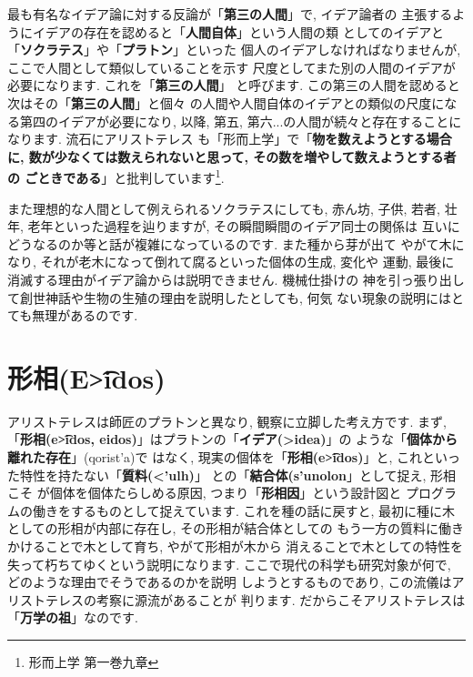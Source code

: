 最も有名なイデア論に対する反論が「\textbf{第三の人間}」で, イデア論者の
主張するようにイデアの存在を認めると「\textbf{人間自体}」という人間の類
としてのイデアと「\textbf{ソクラテス}」や「\textbf{プラトン}」といった
個人のイデアしなければなりませんが, ここで人間として類似していることを示す
尺度としてまた別の人間のイデアが必要になります. これを「\textbf{第三の人間}」
と呼びます. この第三の人間を認めると次はその「\textbf{第三の人間}」と個々
の人間や人間自体のイデアとの類似の尺度になる第四のイデアが必要になり, 以降,
 第五, 第六...の人間が続々と存在することになります.  流石にアリストテレス
も「形而上学」\cite{アリストテレス2}で「\textbf{物を数えようとする場合に,
 数が少なくては数えられないと思って, その数を増やして数えようとする者の
ごときである}」と批判しています\cite{アリストテレス2}\footnote{形而上学
 第一巻九章}.
\newline


また理想的な人間として例えられるソクラテスにしても, 赤ん坊, 子供, 若者,
 壮年, 老年といった過程を辿りますが, その瞬間瞬間のイデア同士の関係は
互いにどうなるのか等と話が複雑になっているのです. また種から芽が出て
やがて木になり, それが老木になって倒れて腐るといった個体の生成, 変化や
運動, 最後に消滅する理由がイデア論からは説明できません. 機械仕掛けの
神を引っ張り出して創世神話や生物の生殖の理由を説明したとしても, 何気
ない現象の説明にはとても無理があるのです.


\section{形相(\textgreek{E\t{>i}dos})}

アリストテレスは師匠のプラトンと異なり, 観察に立脚した考え方です.
 まず, 「\textbf{\textbf{形相(\textgreek{e\t{>i}dos},
 eidos)}}」はプラトンの「\textbf{イデア(\textgreek{>idea})}」の
ような「\textbf{個体から離れた存在}」(\textgreek{qorist'a})で
はなく, 現実の個体を「\textbf{形相(\textgreek{e\t{>i}dos})}」と,
 これといった特性を持たない「\textbf{質料(\textgreek{<'ulh})}」
との「\textbf{結合体(\textgreek{s'unolon}}」として捉え, 形相こそ
が個体を個体たらしめる原因, つまり「\textbf{形相因}」という設計図と
プログラムの働きをするものとして捉えています. これを種の話に戻すと,
 最初に種に木としての形相が内部に存在し, その形相が結合体としての
もう一方の質料に働きかけることで木として育ち, やがて形相が木から
消えることで木としての特性を失って朽ちてゆくという説明になります.
 ここで現代の科学も研究対象が何で, どのような理由でそうであるのかを説明
しようとするものであり, この流儀はアリストテレスの考察に源流があることが
判ります. だからこそアリストテレスは「\textbf{万学の祖}」なのです.
\newline

